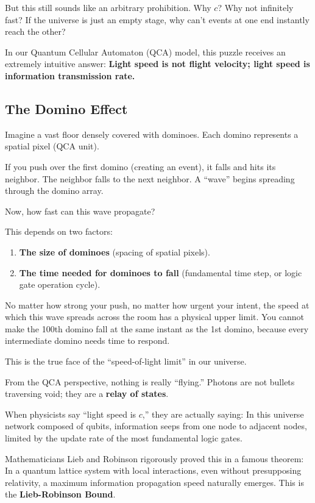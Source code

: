 \documentclass[11pt,a4paper,twoside]{book}
\begin{document}
But this still sounds like an arbitrary prohibition. Why $c$? Why not infinitely fast? If the universe is just an empty stage, why can't events at one end instantly reach the other?

In our Quantum Cellular Automaton (QCA) model, this puzzle receives an extremely intuitive answer: \textbf{Light speed is not flight velocity; light speed is information transmission rate.}

\subsection{The Domino Effect}

Imagine a vast floor densely covered with dominoes. Each domino represents a spatial pixel (QCA unit).

If you push over the first domino (creating an event), it falls and hits its neighbor. The neighbor falls to the next neighbor. A ``wave'' begins spreading through the domino array.

Now, how fast can this wave propagate?

This depends on two factors:

\begin{enumerate}
\item \textbf{The size of dominoes} (spacing of spatial pixels).

\item \textbf{The time needed for dominoes to fall} (fundamental time step, or logic gate operation cycle).
\end{enumerate}

No matter how strong your push, no matter how urgent your intent, the speed at which this wave spreads across the room has a physical upper limit. You cannot make the 100th domino fall at the same instant as the 1st domino, because every intermediate domino needs time to respond.

This is the true face of the ``speed-of-light limit'' in our universe.

From the QCA perspective, nothing is really ``flying.'' Photons are not bullets traversing void; they are a \textbf{relay of states}.

When physicists say ``light speed is $c$,'' they are actually saying: In this universe network composed of qubits, information seeps from one node to adjacent nodes, limited by the update rate of the most fundamental logic gates.

Mathematicians Lieb and Robinson rigorously proved this in a famous theorem: In a quantum lattice system with local interactions, even without presupposing relativity, a maximum information propagation speed naturally emerges. This is the \textbf{Lieb-Robinson Bound}.
\end{document}
